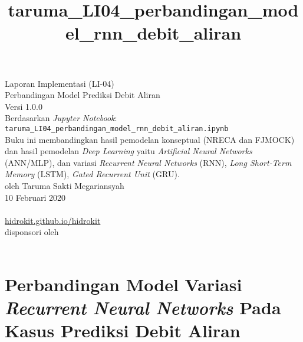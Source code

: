 \documentclass[11pt]{article}
\title{taruma\_LI04\_perbandingan\_model\_rnn\_debit\_aliran}
\begin{document}
    

	\begin{titlepage}
		\vspace*{\fill}
		\begin{center}
 		\normalsize Laporan Implementasi (LI-04)\\
		\huge Perbandingan Model Prediksi Debit Aliran \\ 
		\normalsize Versi 1.0.0 \\[0.2cm]
      	\small Berdasarkan \emph{Jupyter Notebook}: \texttt{taruma\_LI04\_perbandingan\_model\_rnn\_debit\_aliran.ipynb} \\[0.5cm]
      	\normalsize Buku ini membandingkan hasil pemodelan konseptual (NRECA dan FJMOCK) dan hasil pemodelan \emph{Deep Learning} yaitu \emph{Artificial Neural Networks} (ANN/MLP), dan variasi \emph{Recurrent Neural Networks} (RNN), \emph{Long Short-Term Memory} (LSTM), \emph{Gated Recurrent Unit} (GRU).\\[0.5cm]
		\normalsize oleh Taruma Sakti Megariansyah\\[0.5cm]
      	\normalsize 10 Februari 2020\\[1cm]
    	\\
      	\normalsize \href{https://hidrokit.github.io/hidrokit}{hidrokit.github.io/hidrokit}  \\[0.5cm]
      	\small disponsori oleh \\[0.2cm]
    	\href{https://www.fiako.co.id}{}\\
		\end{center}
    	\vspace*{\fill}
	\end{titlepage}
    
    

    
    \hypertarget{perbandingan-model-variasi-recurrent-neural-networks-pada-kasus-prediksi-debit-aliran}{%
\section{\texorpdfstring{Perbandingan Model Variasi \emph{Recurrent
Neural Networks} Pada Kasus Prediksi Debit
Aliran}{Perbandingan Model Variasi Recurrent Neural Networks Pada Kasus Prediksi Debit Aliran}}\label{perbandingan-model-variasi-recurrent-neural-networks-pada-kasus-prediksi-debit-aliran}}
\end{document}
